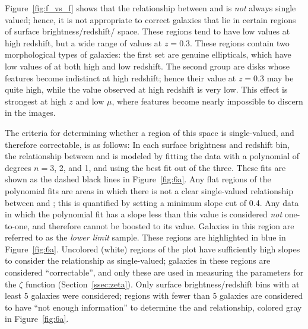 \documentclass[twocolumn]{aastex6}
\begin{document}
Figure~\ref{fig:f_vs_f} shows that the relationship between \ffeaturesz{} and \ffeaturesrest{} is \emph{not} always single valued; hence, it is not appropriate to correct galaxies that lie in certain regions of surface brightness/redshift/\ffeatures{} space. These regions tend to have low \ffeatures{} values at high redshift, but a wide range of values at $z=0.3$. These regions contain two morphological types of galaxies: the first set are genuine ellipticals, which have low values of \ffeatures{} at both high and low redshift. The second group are disks whose features become indistinct at high redshift; hence their \ffeatures{} value at $z=0.3$ may be quite high, while the value observed at high redshift is very low. This effect is strongest at high $z$ and low $\mu$, where features become nearly impossible to discern in the images.

The criteria for determining whether a region of this space is single-valued, and therefore correctable, is as follows: In each surface brightness and redshift bin, the relationship between \ffeaturesz{} and \ffeaturesrest{} is modeled by fitting the data with a polynomial of degrees $n=3$, 2, and 1, and using the best fit out of the three. These fits are shown as the dashed black lines in Figure~\ref{fig:6a}. Any flat regions of the polynomial fits are areas in which there is not a clear single-valued relationship between \ffeaturesz{} and \ffeaturesrest; this is quantified by setting a minimum slope cut of 0.4. Any data in which the polynomial fit has a slope less than this value is considered \emph{not} one-to-one, and therefore \ffeaturesz{} cannot be boosted to its \ffeaturesrest{} value. Galaxies in this region are referred to as the \emph{lower limit} sample. These regions are highlighted in blue in Figure~\ref{fig:6a}. Uncolored (white) regions of the plot have sufficiently high slopes to consider the relationship as single-valued; galaxies in these regions are considered ``correctable'', and only these are used in measuring the parameters for the $\zeta$ function (Section~\ref{ssec:zeta}). Only surface brightness/redshift bins with at least 5 galaxies were considered; regions with fewer than 5 galaxies are considered to have ``not enough information'' to determine the \ffeaturesz{} and \ffeaturesrest{} relationship, colored gray in Figure~\ref{fig:6a}.
\end{document}
